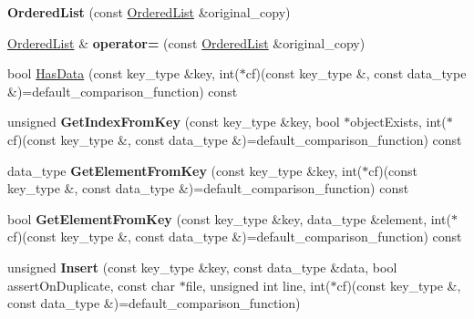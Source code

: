 \begin{DoxyCompactItemize}
\item 
\hypertarget{class_data_structures_1_1_ordered_list_a951c23d62ae43b7955d1f04cd7be19dc}{{\bfseries Ordered\-List} (const \hyperlink{class_data_structures_1_1_ordered_list}{Ordered\-List} \&original\-\_\-copy)}\label{class_data_structures_1_1_ordered_list_a951c23d62ae43b7955d1f04cd7be19dc}

\item 
\hypertarget{class_data_structures_1_1_ordered_list_a3c02e1629599ee604763a55cd8d81a31}{\hyperlink{class_data_structures_1_1_ordered_list}{Ordered\-List} \& {\bfseries operator=} (const \hyperlink{class_data_structures_1_1_ordered_list}{Ordered\-List} \&original\-\_\-copy)}\label{class_data_structures_1_1_ordered_list_a3c02e1629599ee604763a55cd8d81a31}

\item 
bool \hyperlink{class_data_structures_1_1_ordered_list_aecaf8370213fb9ebdd99bc6262a930e6}{Has\-Data} (const key\-\_\-type \&key, int($\ast$cf)(const key\-\_\-type \&, const data\-\_\-type \&)=default\-\_\-comparison\-\_\-function) const 
\item 
\hypertarget{class_data_structures_1_1_ordered_list_a54b7abdd81f650f9d1755a4fd56b1aaa}{unsigned {\bfseries Get\-Index\-From\-Key} (const key\-\_\-type \&key, bool $\ast$object\-Exists, int($\ast$cf)(const key\-\_\-type \&, const data\-\_\-type \&)=default\-\_\-comparison\-\_\-function) const }\label{class_data_structures_1_1_ordered_list_a54b7abdd81f650f9d1755a4fd56b1aaa}

\item 
\hypertarget{class_data_structures_1_1_ordered_list_a9667d272bf826dc1d200f77112f90993}{data\-\_\-type {\bfseries Get\-Element\-From\-Key} (const key\-\_\-type \&key, int($\ast$cf)(const key\-\_\-type \&, const data\-\_\-type \&)=default\-\_\-comparison\-\_\-function) const }\label{class_data_structures_1_1_ordered_list_a9667d272bf826dc1d200f77112f90993}

\item 
\hypertarget{class_data_structures_1_1_ordered_list_ae16343544f15259dad97977b439b7383}{bool {\bfseries Get\-Element\-From\-Key} (const key\-\_\-type \&key, data\-\_\-type \&element, int($\ast$cf)(const key\-\_\-type \&, const data\-\_\-type \&)=default\-\_\-comparison\-\_\-function) const }\label{class_data_structures_1_1_ordered_list_ae16343544f15259dad97977b439b7383}

\item 
\hypertarget{class_data_structures_1_1_ordered_list_a30d44cd52bdb782478472a95cc5a4b0a}{unsigned {\bfseries Insert} (const key\-\_\-type \&key, const data\-\_\-type \&data, bool assert\-On\-Duplicate, const char $\ast$file, unsigned int line, int($\ast$cf)(const key\-\_\-type \&, const data\-\_\-type \&)=default\-\_\-comparison\-\_\-function)}\label{class_data_structures_1_1_ordered_list_a30d44cd52bdb782478472a95cc5a4b0a}


\end{DoxyCompactItemize}
